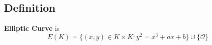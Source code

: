 \documentclass[../lecture-notes.tex]{subfiles}
\begin{document}
\subsection{Definition}

\begin{definition}
    \textbf{Elliptic Curve} is
    \begin{equation}
        E(K) = \{(x,y) \in K \times K: y^2 = x^3 + ax + b\} \cup \{\mathcal{O}\}
    \end{equation}
\end{definition}
\end{document}
